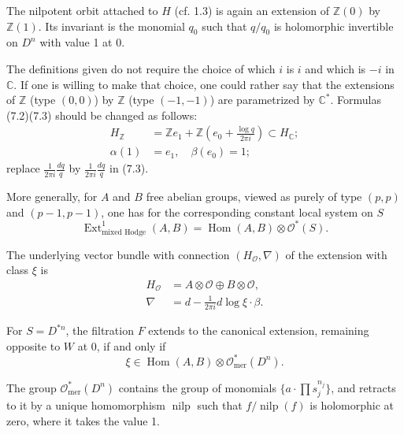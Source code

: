 \documentclass[11pt,a4paper]{article}
\theoremstyle{plain}
\theoremstyle{definition}
\DeclareMathOperator{\Ext}{Ext}
\DeclareMathOperator{\Hom}{Hom}
\DeclareMathOperator{\nilp}{nilp}
\begin{document}
The nilpotent orbit attached to $H$ (cf. 1.3) is again an extension of $\mathbb{Z}(0)$ by $\mathbb{Z}(1)$. Its invariant is the monomial $q_{0}$ such that $q/q_{0}$ is holomorphic invertible on $D^{n}$ with value 1 at 0.

The definitions given do not require the choice of which $i$ is $i$ and which is $-i$ in $\mathbb{C}$. If one is willing to make that choice, one could rather say that the extensions of $\mathbb{Z}$ (type $(0,0)$) by $\mathbb{Z}$ (type $(-1,-1)$) are parametrized by $\mathbb{C}^{*}$. Formulas (7.2)(7.3) should be changed as follows:
\begin{equation}
\begin{aligned}
H_{\mathbb{Z}} &= \mathbb{Z}e_{1} + \mathbb{Z}(e_{0} + \frac{\log q}{2\pi i}) \subset H_{\mathbb{C}}; \\
\alpha(1) &= e_{1}, \quad \beta(e_{0}) = 1;
\end{aligned} \tag{7.2$'$}
\end{equation}
replace $\frac{1}{2\pi i}\frac{dq}{q}$ by $\frac{1}{2\pi i}\frac{dq}{q}$ in (7.3).

More generally, for $A$ and $B$ free abelian groups, viewed as purely of type $(p,p)$ and $(p-1,p-1)$, one has for the corresponding constant local system on $S$
\begin{equation}
\Ext^{1}_{\text{mixed Hodge}}(A,B) = \Hom(A,B) \otimes \mathcal{O}^{*}(S). \tag{7.4}
\end{equation}

The underlying vector bundle with connection $(H_{\mathcal{O}}, \nabla)$ of the extension with class $\xi$ is
\begin{equation}
\begin{aligned}
H_{\mathcal{O}} &= A \otimes \mathcal{O} \oplus B \otimes \mathcal{O}, \\
\nabla &= d - \frac{1}{2\pi i} d\log \xi \cdot \beta.
\end{aligned} \tag{7.5}
\end{equation}

For $S = D^{*n}$, the filtration $F$ extends to the canonical extension, remaining opposite to $W$ at 0, if and only if
\[
\xi \in \Hom(A,B) \otimes \mathcal{O}_{\text{mer}}^{*}(D^{n}).
\]

The group $\mathcal{O}_{\text{mer}}^{*}(D^{n})$ contains the group of monomials $\{a \cdot \prod s_{j}^{n_{j}}\}$, and retracts to it by a unique homomorphism $\nilp$ such that $f/\nilp(f)$ is holomorphic at zero, where it takes the value 1.
\end{document}
